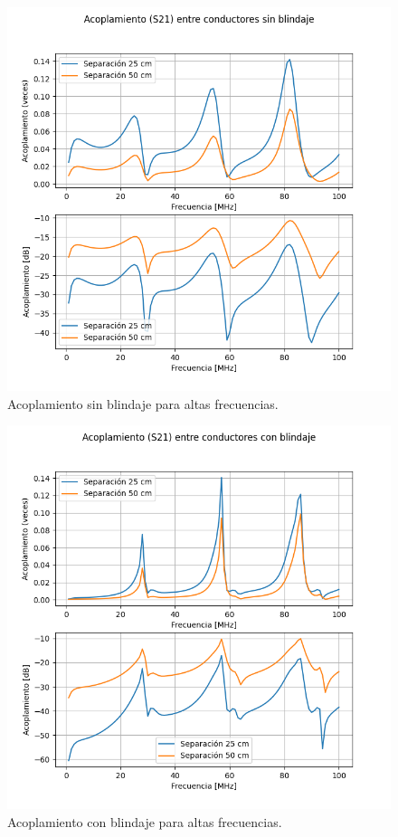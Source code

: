 \begin{figure}[ht]
  \centering
  \includegraphics[width=0.6\linewidth]{imagenes/acoplamiento_sin_blindaje_resultados_altas.png}
  \caption{Acoplamiento sin blindaje para altas frecuencias.}%
  \label{fig:imagenes/acoplamiento_sin_blindaje_resultados_altas}
\end{figure}

\begin{figure}[ht]
  \centering
  \includegraphics[width=0.6\linewidth]{imagenes/acoplamiento_con_blindaje_resultados_altas.png}
  \caption{Acoplamiento con blindaje para altas frecuencias.}%
  \label{fig:imagenes/acoplamiento_con_blindaje_resultados_altas}
\end{figure}
